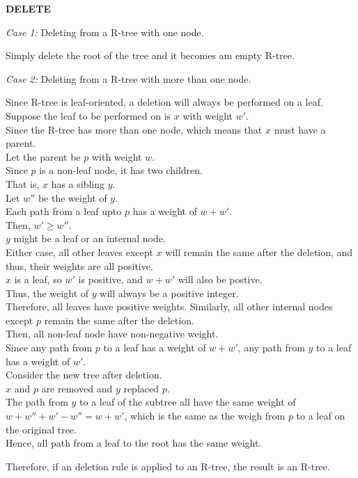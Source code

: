 \documentclass[10pt]{article}
\begin{document}
\begin{enumerate}
	\textbf{DELETE}
	\begin{addmargin}[1em]{0em}
		\textit{Case 1:} Deleting from a R-tree with one node.
		\begin{addmargin}[1em]{0em}
			Simply delete the root of the tree and it becomes am empty R-tree.
		\end{addmargin}
		\textit{Case 2:} Deleting from a R-tree with more than one node.
		\begin{addmargin}[1em]{0em}
			Since R-tree is leaf-oriented, a deletion will always be performed on a leaf. \\
			Suppose the leaf to be performed on is $x$ with weight $w'$. \\
			Since the R-tree has more than one node, which means that $x$ must have a parent. \\
			Let the parent be $p$ with weight $w$. \\
			Since $p$ is a non-leaf node, it has two children. \\
			That is, $x$ has a sibling $y$. \\
			Let $w''$ be the weight of $y$. \\
			Each path from a leaf upto $p$ has a weight of $w+w'$. \\
			Then, $w' \geq w''$. \\
			$y$ might be a leaf or an internal node. \\
			Either case, all other leaves except $x$ will remain the same after the deletion, and thus, their weights are all positive. \\
			$x$ is a leaf, so $w'$ is positive, and $w+w'$ will also be postive. \\
			Thus, the weight of $y$ will always be a positive integer. \\
			Therefore, all leaves have positive weights.
			Similarly, all other internal nodes except $p$ remain the same after the deletion. \\
			Then, all non-leaf node have non-negative weight.\\
			Since any path from $p$ to a leaf has a weight of $w+w'$, any path from $y$ to a leaf has a weight of $w'$. \\
			Consider the new tree after deletion. \\
			$x$ and $p$ are removed and $y$ replaced $p$. \\
			The path from $y$ to a leaf of the subtree all have the same weight of $w+w''+w'-w'' = w+w'$, which is the same as the weigh from $p$ to a leaf on the original tree. \\
			Hence, all path from a leaf to the root has the same weight.
		\end{addmargin}
		Therefore, if an deletion rule is applied to an R-tree, the result is an R-tree.	
	\end{addmargin}


\end{enumerate}
\end{document}
